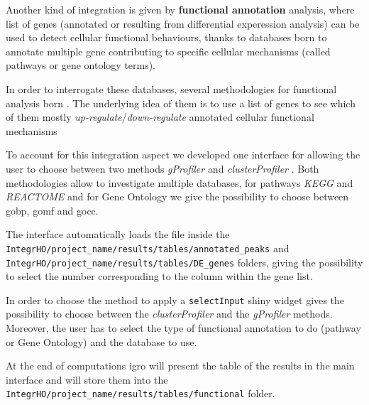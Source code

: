 Another kind of integration is given by \textbf{functional annotation} analysis, where list of genes (annotated or resulting from differential experession analysis) can be used to detect cellular functional behaviours, thanks to databases born to annotate multiple gene contributing to specific cellular mechanisms (called pathways or gene ontology terms).

In order to interrogate these databases, several methodologies for functional analysis born \cite{Subramanian2005, Sales2012a, Reimand2016, Yu2012, Huang2009}.
The underlying idea of them is to use a list of genes to see which of them mostly \textit{up-regulate}/\textit{down-regulate} annotated cellular functional mechanisms

To account for this integration aspect we developed one interface for allowing the user to choose between two methods \textit{gProfiler} \cite{Reimand2016} and \textit{clusterProfiler} \cite{Yu2012}.
Both methodologies allow to investigate multiple databases, for pathways \textit{KEGG} and \textit{REACTOME} and for Gene Ontology we give the possibility to choose between \gls{gobp}, \gls{gomf} and \gls{gocc}.

The interface automatically loads the file inside the \lstinline!IntegrHO/project_name/results/tables/annotated_peaks! and \lstinline!IntegrHO/project_name/results/tables/DE_genes! folders, giving the possibility to select the number corresponding to the column within the gene list.

In order to choose the method to apply a \lstinline!selectInput! shiny widget gives the possibility to choose between the \textit{clusterProfiler} and the \textit{gProfiler} methods.
Moreover, the user has to select the type of functional annotation to do (pathway or Gene Ontology) and the database to use.

At the end of computations \gls{igro} will present the table of the results in the main interface and will store them into the  \lstinline!IntegrHO/project_name/results/tables/functional! folder.

